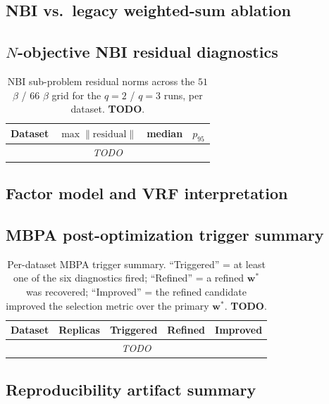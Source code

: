 \subsection{NBI vs.\ legacy weighted-sum ablation}
\label{sec:res-ablation}

\subsection{$N$-objective NBI residual diagnostics}
\label{sec:res-nbi-residuals}
\begin{table}[t]
  \centering
  \caption{NBI sub-problem residual norms across the $51$ $\beta$ /
  $66$ $\beta$ grid for the $q{=}2$ / $q{=}3$ runs, per dataset.
  \textbf{TODO}.}
  \label{tab:nbi-residuals}
  \begin{tabular}{lrrr}
    \toprule
    Dataset & $\max \|\text{residual}\|$ & median & $p_{95}$ \\
    \midrule
    \multicolumn{4}{c}{\textit{TODO}} \\
    \bottomrule
  \end{tabular}
\end{table}

\subsection{Factor model and VRF interpretation}
\label{sec:res-vrf}

\subsection{MBPA post-optimization trigger summary}
\label{sec:res-mbpa}
\begin{table}[t]
  \centering
  \caption{Per-dataset MBPA trigger summary. ``Triggered'' = at least
  one of the six diagnostics fired; ``Refined'' = a refined
  $\bm w^{*}$ was recovered; ``Improved'' = the refined candidate
  improved the selection metric over the primary $\bm w^{*}$.
  \textbf{TODO}.}
  \label{tab:mbpa}
  \begin{tabular}{lrrrr}
    \toprule
    Dataset & Replicas & Triggered & Refined & Improved \\
    \midrule
    \multicolumn{5}{c}{\textit{TODO}} \\
    \bottomrule
  \end{tabular}
\end{table}

\subsection{Reproducibility artifact summary}
\label{sec:res-artifacts}
